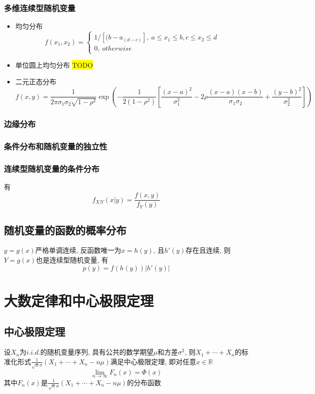 \documentclass[UTF8]{article}
\newcommand{\expo}[1]{\exp\left(#1\right)}
\newcommand{\leftbig}[1]{\left\{\begin{array}{l}#1\end{array}\right.}
\begin{document}
\subsubsection{多维连续型随机变量}
\begin{itemize}
	\item 均匀分布
	$$f(x_1,x_2)=\leftbig{1/[(b-a_(d-c)],\ a\le x_1\le b, c\le x_2\le d\\0,\ otherwise}$$
	
	\item 单位圆上均匀分布
	\colorbox{yellow}{TODO}
	
	\item 二元正态分布
	$$f(x,y)=\frac{1}{2\pi\sigma_1\sigma_2\sqrt{1-\rho^2}}\expo{-\frac{1}{2(1-\rho^2)}\left[\frac{(x-a)^2}{\sigma_1^2}-2\rho\frac{(x-a)(x-b)}{\sigma_1\sigma_2}+\frac{(y-b)^2}{\sigma_2^2}\right]}$$
\end{itemize}

\subsubsection{边缘分布}

\subsubsection{条件分布和随机变量的独立性}

\subsubsection{连续型随机变量的条件分布}
有
$$f_{X|Y}(x|y)=\frac{f(x,y)}{f_Y(y)}$$

\subsection{随机变量的函数的概率分布}
$y=g(x)$严格单调连续, 反函数唯一为$x=h(y)$, 且$h'(y)$存在且连续, 则$Y=g(x)$也是连续型随机变量, 有$$p(y)=f(h(y))|h'(y)|$$

\section{大数定律和中心极限定理}
\subsection{中心极限定理}
设${X_n}$为$i.i.d.$的随机变量序列, 具有公共的数学期望$\mu$和方差$\sigma^2$, 则$X_1+\cdots+X_n$的标准化形式$\frac{1}{\sqrt{n}\sigma}(X_1+\cdots+X_n-n\mu)$满足中心极限定理, 即对任意$x\in\mathbb{R}$
$$\lim\limits_{n\rightarrow \infty}F_n(x)=\Phi(x)$$
其中$F_n(x)$是$\frac{1}{\sqrt{n}\sigma}(X_1+\cdots+X_n-n\mu)$的分布函数
\end{document}
